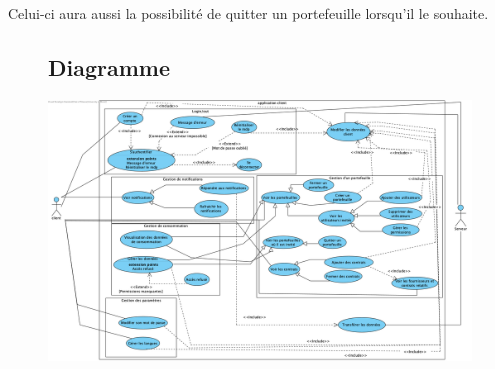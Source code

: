\begin{flushleft}
Celui-ci aura aussi la possibilité de quitter un portefeuille lorsqu’il le souhaite.
\end{flushleft}

\newpage

\begin{figure}[h]
\subsection{Diagramme}
\centering
\includegraphics[width = 1\textwidth]{Extension-claire/Usecase-claire/img/usecase.png}
\end{figure}
